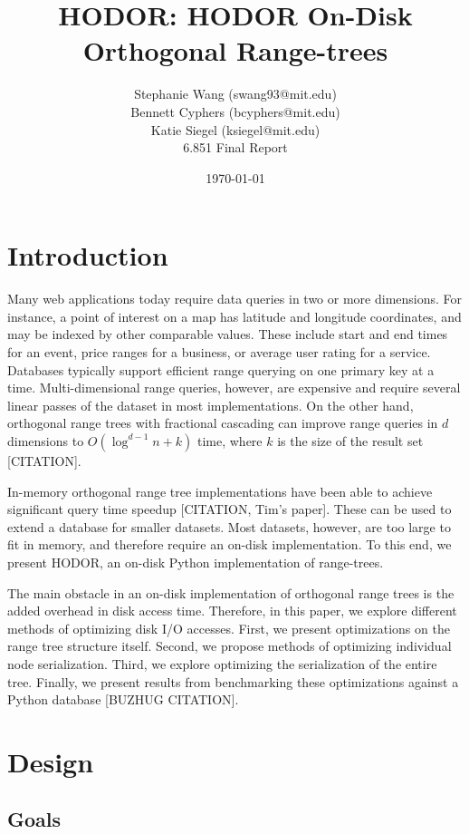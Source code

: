 \documentclass[11pt, oneside]{article}
\title{HODOR: HODOR On-Disk Orthogonal Range-trees}
\author{Stephanie Wang (swang93@mit.edu)\\
Bennett Cyphers (bcyphers@mit.edu)\\
Katie Siegel (ksiegel@mit.edu)\\[2ex]
6.851 Final Report}
\date{\today}
\begin{document}
\maketitle
\clearpage

\section{Introduction}

Many web applications today require data queries in two or more dimensions. For
instance, a point of interest on a map has latitude and longitude coordinates,
and may be indexed by other comparable values. These include start and end
times for an event, price ranges for a business, or average user rating for a
service. Databases typically support efficient range querying on one primary
key at a time. Multi-dimensional range queries, however, are expensive and
require several linear passes of the dataset in most implementations. On the
other hand, orthogonal range trees with fractional cascading can improve range
queries in $d$ dimensions to $O(\log^{d-1} n + k)$ time, where $k$ is the size
of the result set [CITATION]. 

In-memory orthogonal range tree implementations have been able to achieve
significant query time speedup [CITATION, Tim's paper]. These can be used to
extend a database for smaller datasets. Most datasets, however, are too large
to fit in memory, and therefore require an on-disk implementation. To this end,
we present HODOR, an on-disk Python implementation of range-trees. 

The main obstacle in an on-disk implementation of orthogonal range trees is the
added overhead in disk access time. Therefore, in this paper, we explore
different methods of optimizing disk I/O accesses. First, we present
optimizations on the range tree structure itself. Second, we propose methods of
optimizing individual node serialization. Third, we explore optimizing the
serialization of the entire tree. Finally, we present results from benchmarking
these optimizations against a Python database [BUZHUG CITATION]. 


\section{Design}

\subsection{Goals}
\end{document}
